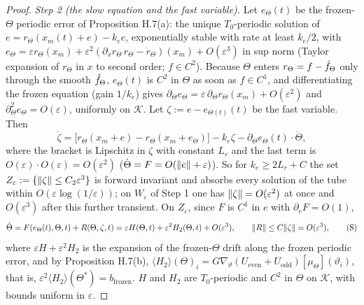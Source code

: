 \begin{proof}
\smallskip
\emph{Step 2 (the slow equation and the fast variable).} Let $e_\Theta(t)$ be the frozen-$\Theta$ periodic error of
Proposition H.7(a): the unique $T_0$-periodic solution of $\dot e = r_\Theta(x_m(t) + e) - k_e e$, exponentially
stable with rate at least $k_e/2$, with
$e_\Theta = \varepsilon r_\Theta(x_m) + \varepsilon^2(\partial_xr_\Theta\,r_\Theta - \dot r_\Theta)(x_m) + O(\varepsilon^3)$
in sup norm (Taylor expansion of $r_\Theta$ in $x$ to second order; $f\in C^2$). Because $\Theta$ enters
$r_\Theta = f - \hat f_\Theta$ only through the smooth $\hat f_\Theta$, $e_\Theta(t)$ is $C^2$ in $\Theta$ as soon as
$f\in C^1$, and differentiating the frozen equation (gain $1/k_e$) gives
$\partial_\Theta e_\Theta = \varepsilon\,\partial_\Theta r_\Theta(x_m) + O(\varepsilon^2)$ and
$\partial^2_\Theta e_\Theta = O(\varepsilon)$, uniformly on $\mathcal K$. Let $\zeta := e - e_{\Theta(t)}(t)$ be the
fast variable. Then
\[
  \dot\zeta = \bigl[r_\Theta(x_m + e) - r_\Theta(x_m + e_\Theta)\bigr] - k_e\zeta - \partial_\Theta e_\Theta(t)\cdot\dot\Theta,
\]
where the bracket is Lipschitz in $\zeta$ with constant $L_r$ and the last term is
$O(\varepsilon)\cdot O(\varepsilon) = O(\varepsilon^2)$ ($\dot\Theta = F = O(\lVert e\rVert + \varepsilon)$). So for
$k_e\ge2L_r + C$ the set $Z_\varepsilon := \{\lVert \zeta\rVert \le C_2\varepsilon^3\}$ is forward invariant and absorbs
every solution of the tube within $O(\varepsilon\log(1/\varepsilon))$; on $W_\varepsilon$ of Step 1 one has
$\lVert \zeta\rVert = O(\varepsilon^2)$ at once and $O(\varepsilon^3)$ after this further transient. On $Z_\varepsilon$,
since $F$ is $C^1$ in $e$ with $\partial_eF = O(1)$,
\begin{equation}
  \dot\Theta = F(e_\Theta(t),\Theta,t) + R(\Theta,\zeta,t)
  = \varepsilon H(\Theta,t) + \varepsilon^2H_2(\Theta,t) + O(\varepsilon^3),\qquad
  \lVert R\rVert \le C\lVert \zeta\rVert = O(\varepsilon^3),
  \tag{S}
\end{equation}
where $\varepsilon H + \varepsilon^2H_2$ is the expansion of the frozen-$\Theta$ drift along the frozen periodic
error, and by Proposition H.7(b),
$\langle H_2\rangle(\Theta)_i = G\nabla_\vartheta(U_{\mathrm{even}} + U_{\mathrm{odd}})[\mu_\Theta](\vartheta_i)$, that
is, $\varepsilon^2\langle H_2\rangle(\Theta^*) = b_{\mathrm{frozen}}$. $H$ and $H_2$ are $T_0$-periodic and $C^2$ in
$\Theta$ on $\mathcal K$, with bounds uniform in $\varepsilon$.


\end{proof}
